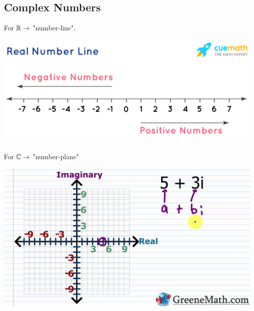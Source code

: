     \subsection{Complex Numbers}
    For $\mathbb{R}\rightarrow$ "number-line". 
    \begin{center}
        \includegraphics[totalheight=3cm]{Images/lec18_number_line.png}
    \end{center}
    For $\mathbb{C}\rightarrow$ "number-plane"
    \begin{center}
        \includegraphics[totalheight=4cm]{Images/leg18_number_plane}
    \end{center}

